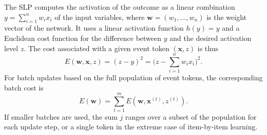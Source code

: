 \documentclass[conference]{IEEEtran}
\newcommand{\psup}[1]{\ensuremath{^{(#1)}}}
\newcommand{\psupt}{\psup{t}}
\begin{document}
The SLP computes the activation of the outcome as a linear combination $y = \sum_{i=1}^n w_i x_i$ of the input variables, where $\mathbf{w} = (w_1, \ldots, w_n)$ is the weight vector of the network.  It uses a linear activation function $h(y) = y$ and a Euclidean cost function for the difference between $y$ and the desired activation level $z$.  The cost associated with a given event token $(\mathbf{x}, z)$ is thus
\begin{equation}
  \label{eq:cost-single}
  E(\mathbf{w}, \mathbf{x}, z) = (z - y)^2 = \biggl( z - \sum_{i=1}^n w_i x_i \biggr)^2 .
\end{equation}
For batch updates based on the full population of event tokens, the corresponding batch cost is
\begin{equation}
  \label{eq:cost-batch}
  E(\mathbf{w}) = \sum_{t=1}^m E(\mathbf{w}, \mathbf{x}\psupt, z\psupt) .
\end{equation}
If smaller batches are used, the sum $j$ ranges over a subset of the population for each update step, or a single token in the extreme case of item-by-item learning.
\end{document}
